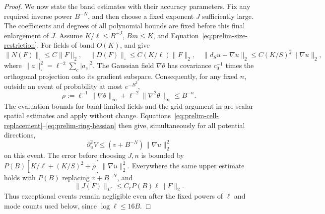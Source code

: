 \begin{proof}
We now state the band estimates with their accuracy parameters. Fix any
required inverse power $B^{-N}$, and then choose a fixed exponent $J$
sufficiently large. The coefficients and degrees of all polynomial
bounds are fixed before this final enlargement of $J$. Assume $K/\ell\le B^{-J}$, $Bm\le K$, and
Equation~\eqref{eq:prelim-size-restriction}. For fields of band $O(K)$,
 and  give
\[
 \|N(F)\|_\square\le C\|F\|_2,\quad
 \|D(F)\|_\square\le C(K/\ell)\|F\|_2,\quad
 \|d_Su-\nabla u\|_2\le C(K/S)^2\|\nabla u\|_2,
\]
where $\|a\|_\square^2=\ell^{-2}\sum_c|a_c|^2$.
The Gaussian field $\nabla\theta$ has covariance $c_0^{-1}$ times the
orthogonal projection onto its gradient subspace. Consequently, for
any fixed $n$, outside an event of probability at most $e^{-B^3}$,
\[
 \rho:=\ell^{-1}\|\nabla\theta\|_\infty+
       \ell^{-2}\|\nabla^2\theta\|_\infty\le B^{-n}.
\]
The evaluation bounds for band-limited fields and the grid argument in
 are scalar spatial estimates and apply without
change. Equations~\eqref{eq:prelim-cell-replacement}--\eqref{eq:prelim-ring-hessian}
then give, simultaneously for all potential directions,
\begin{equation}
 \partial_u^2V\le(v+B^{-N})\|\nabla u\|_2^2
 \label{eq:prelim-band-hessian}
\end{equation}
on this event. The error before choosing $J,n$ is bounded by
$P(B)[K/\ell+(K/S)^2+\rho]\|\nabla u\|_2^2$. Everywhere the same
upper estimate holds with $P(B)$ replacing $v+B^{-N}$, and
\begin{equation}
 \|J(F)\|_{L^r}\le C_rP(B)\ell\|F\|_2.
 \label{eq:prelim-crude-current}
\end{equation}
Thus exceptional events remain negligible even after the fixed powers
of $\ell$ and mode counts used below, since $\log\ell\le16B$.


\end{proof}
